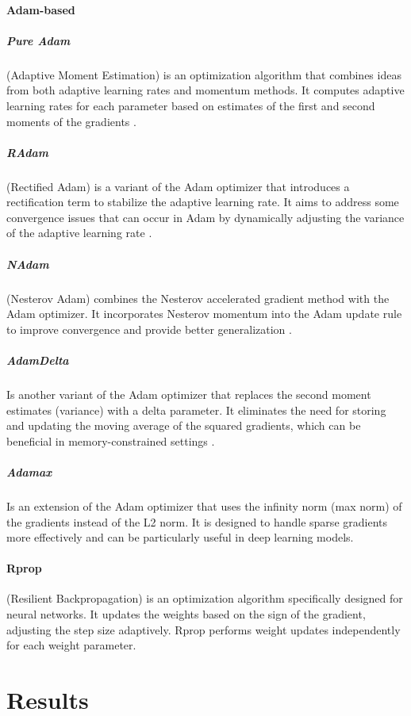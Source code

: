 \documentclass[a4paper]{article}
\begin{document}
	\paragraph{Adam-based}
	\subparagraph{Pure Adam}
	(Adaptive Moment Estimation) is an optimization algorithm that combines ideas from both adaptive learning rates and momentum methods.
	It computes adaptive learning rates for each parameter based on estimates of the first and second moments of the gradients \cite{kingma2017}.
	\subparagraph{RAdam}
	(Rectified Adam) is a variant of the Adam optimizer that introduces a rectification term to stabilize the adaptive learning rate.
	It aims to address some convergence issues that can occur in Adam by dynamically adjusting the variance of the adaptive learning rate \cite{liu2021}.
	\subparagraph{NAdam}
	(Nesterov Adam) combines the Nesterov accelerated gradient method with the Adam optimizer.
	It incorporates Nesterov momentum into the Adam update rule to improve convergence and provide better generalization \cite{tato2018}.
	\subparagraph{AdamDelta}
	Is another variant of the Adam optimizer that replaces the second moment estimates (variance) with a delta parameter.
	It eliminates the need for storing and updating the moving average of the squared gradients, which can be beneficial in memory-constrained settings \cite{zeiler2012}.
	\subparagraph{Adamax}
	Is an extension of the Adam optimizer that uses the infinity norm (max norm) of the gradients instead of the L2 norm. It is designed to handle sparse gradients more effectively and can be particularly useful in deep learning models.

	\paragraph{Rprop}
	(Resilient Backpropagation) is an optimization algorithm specifically designed for neural networks.
	It updates the weights based on the sign of the gradient, adjusting the step size adaptively.
	Rprop performs weight updates independently for each weight parameter.
	
	
	
	\section{Results}
\end{document}
